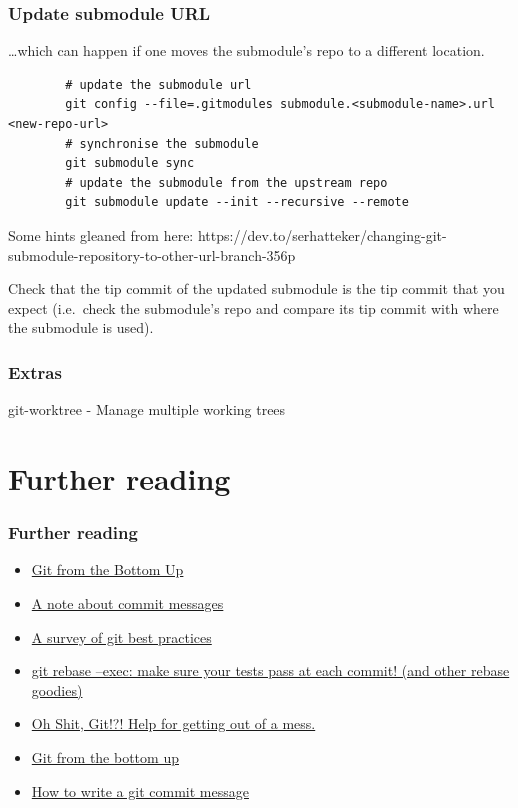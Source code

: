 \begin{frame}[fragile]
    \frametitle{Update submodule URL}

    \ldots which can happen if one moves the submodule's repo to a different
    location.

    \begin{verbatim}
        # update the submodule url
        git config --file=.gitmodules submodule.<submodule-name>.url <new-repo-url>
        # synchronise the submodule
        git submodule sync
        # update the submodule from the upstream repo
        git submodule update --init --recursive --remote
    \end{verbatim}

    Some hints gleaned from here:
    https://dev.to/serhatteker/changing-git-submodule-repository-to-other-url-branch-356p

    Check that the tip commit of the updated submodule is the tip commit
    that you expect (i.e.\ check the submodule's repo and compare its tip
    commit with where the submodule is used).
\end{frame}

\begin{frame}
\frametitle{Extras}
git-worktree - Manage multiple working trees
\end{frame}

\section{Further reading}

\begin{frame}
\frametitle{Further reading}
\begin{itemize}
    \item \href{http://jwiegley.github.io/git-from-the-bottom-up/}{Git from the Bottom Up}
    \item \href{http://tbaggery.com/2008/04/19/a-note-about-git-commit-messages.html}
               {A note about commit messages}
    \item \href{https://xdg.me/blog/a-survey-of-git-best-practices/}
               {A survey of git best practices}
    \item \href{http://kamalmarhubi.com/blog/2016/03/08/git-rebase-exec-make-sure-your-tests-pass-at-each-commit-and-other-rebase-goodies/}
               {git rebase --exec: make sure your tests pass at each commit!  (and other rebase goodies)}
    \item \href{https://ohshitgit.com/}{Oh Shit, Git!?!  Help for getting out of a mess.}
    \item \href{https://jwiegley.github.io/git-from-the-bottom-up/}{Git from the bottom up}
    \item \href{https://cbea.ms/git-commit/}{How to write a git commit message}
\end{itemize}
\end{frame}

